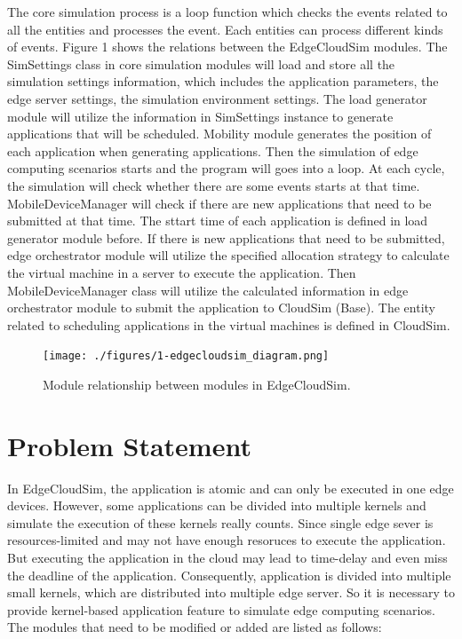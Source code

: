 The core simulation process is a loop function which checks the events related to all the entities and processes the event. Each entities can process different kinds of events. Figure 1 shows the relations between the EdgeCloudSim modules. The SimSettings class in core simulation modules will load and store all the simulation settings information, which includes the application parameters, the edge server settings, the simulation environment settings. The load generator module will utilize the information in SimSettings instance to generate applications that will be scheduled. Mobility module generates the position of each application when generating applications. Then the simulation of edge computing scenarios starts and the program will goes into a loop. At each cycle, the simulation will check whether there are some events starts at that time. MobileDeviceManager will check if there are new applications that need to be submitted at that time. The sttart time of each application is defined in load generator module before. If there is new applications that need to be submitted, edge orchestrator module will utilize the specified allocation strategy to calculate the virtual machine in a server to execute the application. Then MobileDeviceManager class will utilize the calculated information in edge orchestrator module to submit the application to CloudSim (Base). The entity related to scheduling applications in the virtual machines is defined in CloudSim.


\begin{figure}
	\centering
	\texttt{[image: ./figures/1-edgecloudsim\_diagram.png]}
	\caption{\label{fig:module}Module relationship between modules in EdgeCloudSim.}
\end{figure}


\section{Problem Statement}
In EdgeCloudSim, the application is atomic and can only be executed in one edge devices. However, some applications can be divided into multiple kernels and simulate the execution of these kernels really counts. Since single edge sever is resources-limited and may not have enough resoruces to execute the application. But executing the application in the cloud may lead to time-delay and even miss the deadline of the application.  Consequently, application is divided into multiple small kernels, which are distributed into multiple edge server. So it is necessary to provide kernel-based application feature to simulate edge computing scenarios. The modules that need to be modified or added are listed as follows:

